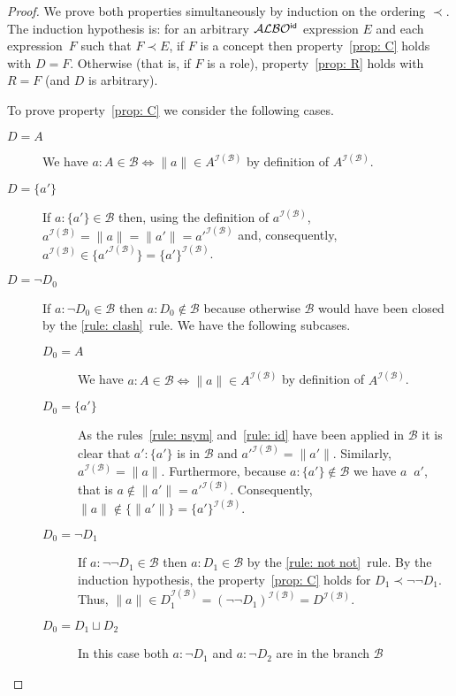 \documentclass[leqno
,pdflatex
,prodmode
,acmtocl
]{acmsmall}
\newcommand{\mathcmd}[1]{\ensuremath{#1}\xspace}
\newcommand{\dlfont}{\mathcal}
\newcommand{\dl}[1]{\mathcmd{\dlfont{#1}}}
\newcommand{\idRole}{\mathcmd{\textsf{\upshape\mdseries id}}}
\newcommand{\ALBOid}{\dl{ALBO\smash[t]{\mbox{${}^{\idRole}$}}}}
\def\Not{\neg}
\def\Or{\sqcup}
\newcommand{\branch}[1]{\seg{#1}}
\newcommand{\seg}[1]{\mathcmd{\mathcal{#1}}}
\newcommand{\indiv}{a}
\newcommand{\cname}{A}
\newcommand{\I}{\mathcal{I}}
\newcommand{\notsimB}{\mathop{\not\sim_\branch{B}}}
\newcommand{\IB}{{\I(\branch{B})}}
\begin{document}
\begin{proof}
We prove both properties simultaneously by induction on the 
ordering $\prec$.
The induction hypothesis is:
for an arbitrary \ALBOid expression $E$
and each expression~$F$ such that $F\prec E$,
if $F$ is a concept then property~\eqref{prop: C} holds with $D=F$.
Otherwise (that is, if $F$ is a role), property~\eqref{prop: R} holds with $R=F$ (and $D$ is arbitrary).

To prove property~\eqref{prop: C} we consider the following cases.
\begin{description}
 \item[$D=\cname$] We have $\indiv: \cname\in\branch{B}\iff\|\indiv\|\in \cname^\IB$ by definition of $\cname^\IB$.
 \item[$D=\{\indiv'\}$] If $\indiv:\{\indiv'\}\in\branch{B}$ then, using the definition of $\indiv^\IB$,
      $\indiv^\IB=\|\indiv\|=\|\indiv'\|=\indiv'^\IB$ and,
      consequently, $\indiv^\IB\in\{\indiv'^\IB\}=\{\indiv'\}^\IB$.
 \item[$D=\Not D_0$] If $\indiv:\Not D_0\in\branch{B}$ then $\indiv:D_0\notin\branch{B}$ because
    otherwise $\branch{B}$ would have been closed by the \eqref{rule: clash}~rule.
    We have the following subcases.
    \begin{description}
     \item[$D_0=\cname$] We have $\indiv: \cname\in\branch{B}\iff\|\indiv\|\in \cname^\IB$ by definition of $\cname^\IB$.
     \item[$D_0=\{\indiv'\}$] As the rules~\eqref{rule: nsym} and~\eqref{rule: id} have been applied in $\branch{B}$
                             it is clear
                             that $\indiv':\{\indiv'\}$ is in $\branch{B}$ and $\indiv'^\IB=\|\indiv'\|$.
                             Similarly, $\indiv^\IB=\|\indiv\|$.
                             Furthermore, because $\indiv:\{\indiv'\}\notin\branch{B}$ we have $\indiv\notsimB\indiv'$,
                             that is $\indiv\notin\|\indiv'\|=\indiv'^\IB$. 
                             Consequently, $\|\indiv\|\notin\{\|\indiv'\|\}=\{\indiv'\}^\IB$.
     \item[$D_0=\Not D_1$] 
        If $\indiv:\Not\Not D_1\in\branch{B}$ then $\indiv:D_1\in\branch{B}$ 
        by the \eqref{rule: not not}~rule.
        By the induction hypothesis, the property~\eqref{prop: C} holds for $D_1\prec\Not\Not D_1$.
        Thus, $\|\indiv\|\in D_1^\IB=(\Not\Not D_1)^\IB=D^\IB$.
     \item[$D_0=D_1\Or D_2$] In this case both $\indiv:\Not D_1$ and $\indiv:\Not D_2$ are in the branch $\branch{B}$

\end{description}
\end{description}
\end{proof}
\end{document}
